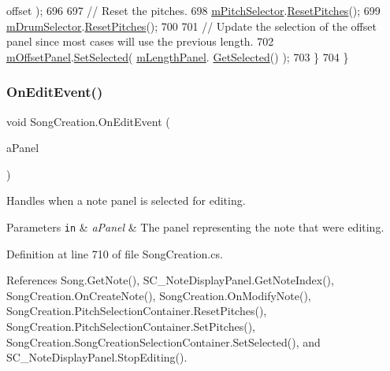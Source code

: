 \begin{DoxyCode}
      offset );
696 
697             \textcolor{comment}{// Reset the pitches.}
698             \hyperlink{group___s_c_priv_var_gac32e68713b2b504807f52acef445df1c}{mPitchSelector}.\hyperlink{group___s_c_handlers_ga9dc0b40102f1fb0e50fdf07ca7b31d96}{ResetPitches}();
699             \hyperlink{group___s_c_priv_var_ga3f1c71d8cabe505745220d728c6f97bc}{mDrumSelector}.\hyperlink{group___s_c_handlers_ga9dc0b40102f1fb0e50fdf07ca7b31d96}{ResetPitches}();
700 
701             \textcolor{comment}{// Update the selection of the offset panel since most cases will use the previous length.}
702             \hyperlink{group___s_c_priv_var_gafeeda8ab122f574c6fff94814234334c}{mOffsetPanel}.\hyperlink{group___s_c_handlers_ga71307336af2197a0ee20bbaf3bfb02aa}{SetSelected}( \hyperlink{group___s_c_priv_var_ga370237b50bc11a581fc963cdd8ffd4ea}{mLengthPanel}.
      \hyperlink{group___s_c_handlers_gac1a7dd19ee5cf14d87a09e803432acd1}{GetSelected}() );
703         \}
704     \}
\end{DoxyCode}
\mbox{\label{group___s_c_handlers_ga0e93e30073bd61526f8ac1431cc4d2b6}} 
\subsubsection{\texorpdfstring{On\+Edit\+Event()}{OnEditEvent()}}
{\footnotesize\ttfamily void Song\+Creation.\+On\+Edit\+Event (\begin{DoxyParamCaption}\item[{\hyperlink{class_s_c___note_display_panel}{S\+C\+\_\+\+Note\+Display\+Panel}}]{a\+Panel }\end{DoxyParamCaption})}



Handles when a note panel is selected for editing. 


\begin{DoxyParams}[1]{Parameters}
\mbox{\tt in}  & {\em a\+Panel} & The panel representing the note that we\textquotesingle{}re editing. \\
\hline
\end{DoxyParams}


Definition at line 710 of file Song\+Creation.\+cs.



References Song.\+Get\+Note(), S\+C\+\_\+\+Note\+Display\+Panel.\+Get\+Note\+Index(), Song\+Creation.\+On\+Create\+Note(), Song\+Creation.\+On\+Modify\+Note(), Song\+Creation.\+Pitch\+Selection\+Container.\+Reset\+Pitches(), Song\+Creation.\+Pitch\+Selection\+Container.\+Set\+Pitches(), Song\+Creation.\+Song\+Creation\+Selection\+Container.\+Set\+Selected(), and S\+C\+\_\+\+Note\+Display\+Panel.\+Stop\+Editing().




